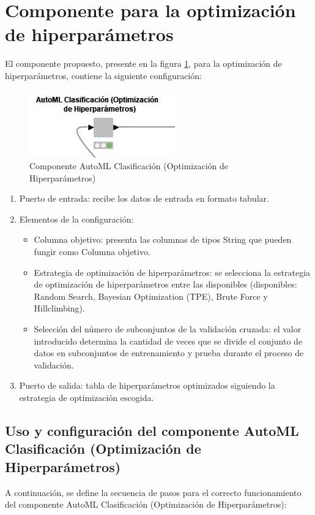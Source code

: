\section{Componente para la optimización de hiperparámetros}
El componente propuesto, presente en la figura \ref{fig:automl-componente-hpo}, para la optimización de hiperparámetros, contiene la siguiente configuración:
\begin{figure}[H]
	\centering
	\includegraphics[width=0.35\linewidth]{"figuras/capi 2/automl-componente-hpo"}
	\caption[Componente AutoML Clasificación (Optimización de Hiperparámetros)]{Componente AutoML Clasificación (Optimización de Hiperparámetros)}
	\label{fig:automl-componente-hpo}
\end{figure}
\begin{enumerate}
	\item Puerto de entrada: recibe los datos de entrada en formato tabular.
	\item Elementos de la configuración:
	\begin{itemize}
		\item Columna objetivo: presenta las columnas de tipos String que pueden fungir como Columna objetivo.
		\item Estrategia de optimización de hiperparámetros: se selecciona la estrategia de optimización de hiperparámetros entre las disponibles (disponibles: Random Search, Bayesian Optimization (TPE), Brute Force y Hillclimbing).
		\item Selección del número de subconjuntos de la validación cruzada: el valor introducido determina la cantidad de veces que se divide el conjunto de datos en subconjuntos de entrenamiento y prueba durante el proceso de validación.
	\end{itemize}
	\item Puerto de salida: tabla de hiperparámetros optimizados siguiendo la estrategia de optimización escogida.
\end{enumerate}

\subsection{Uso y configuración del componente AutoML Clasificación (Optimización de Hiperparámetros)}
A continuación, se define la secuencia de pasos para el correcto funcionamiento del componente AutoML Clasificación (Optimización de Hiperparámetros):

